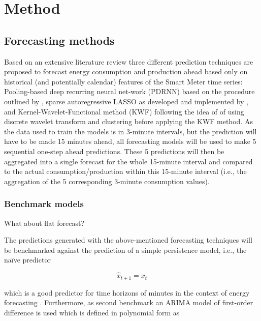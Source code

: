 
\section{Method}\label{Sec:Method}




\subsection{Forecasting methods}\label{Sec:Method;Subsec:Forecast}

Based on an extensive literature review three different prediction techniques are proposed to forecast energy consumption and production ahead based only on historical (and potentially calendar) features of the Smart Meter time series: Pooling-based deep recurring neural net-work (PDRNN) based on the procedure outlined by \citet{Shi:2017}, sparse autoregressive LASSO as developed and implemented by \citet{Li:2017}, and Kernel-Wavelet-Functional method (KWF) following the idea of \citet{Auder:2018} of using discrete wavelet transform and clustering before applying the KWF method.
As the data used to train the models is in 3-minute intervals, but the prediction will have to be made 15 minutes ahead, all forecasting models will be used to make 5 sequential one-step ahead predictions. These 5 predictions will then be aggregated into a single forecast for the whole 15-minute interval and compared to the actual consumption/production within this 15-minute interval (i.e., the aggregation of the 5 corresponding 3-minute consumption values).


\subsubsection{Benchmark models}

What about flat forecast?


The predictions generated with the above-mentioned forecasting techniques will be benchmarked against the prediction of a simple persistence model, i.e., the naïve predictor

\begin{equation} \label{Eq:naivepred}
\widehat{x}_{t+1}=x_t
\end{equation}

which is a good predictor for time horizons of minutes in the context of energy forecasting \citep{Pinson:2012}. Furthermore, as second benchmark an ARIMA model of first-order difference is used which is defined in polynomial form as

